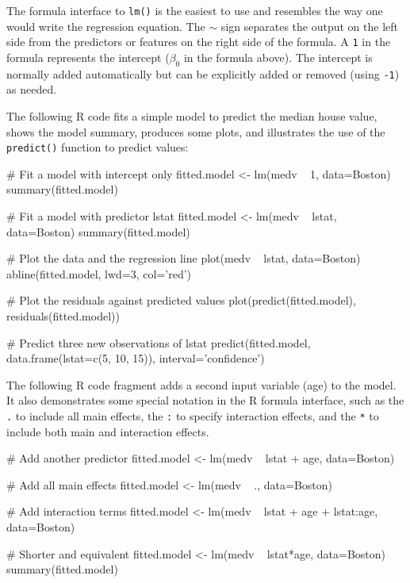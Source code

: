 The formula interface to \texttt{lm()} is the easiest to use and resembles the way one would write the regression equation. The $\sim$ sign separates the output on the left side from the predictors or features on the right side of the formula. A \texttt{1} in the formula represents the intercept ($\beta_0$ in the formula above). The intercept is normally added automatically but can be explicitly added or removed (using \texttt{-1}) as needed. 

The following R code fits a simple model to predict the median house value, shows the model summary, produces some plots, and illustrates the use of the \texttt{predict()} function to predict values:

\begin{samepage}
\begin{Rcode}
# Fit a model with intercept only
fitted.model <- lm(medv ~ 1, data=Boston)
summary(fitted.model)

# Fit a model with predictor lstat
fitted.model <- lm(medv ~ lstat, data=Boston)
summary(fitted.model)

# Plot the data and the regression line
plot(medv ~ lstat, data=Boston)
abline(fitted.model, lwd=3, col='red')

# Plot the residuals against predicted values
plot(predict(fitted.model), residuals(fitted.model))

# Predict three new observations of lstat
predict(fitted.model, data.frame(lstat=c(5, 10, 15)), 
   interval='confidence')
\end{Rcode}
\end{samepage}

The following R code fragment adds a second input variable (age) to the model. It also demonstrates some special notation in the R formula interface, such as the \texttt{.} to include all main effects, the \texttt{:} to specify interaction effects, and the \texttt{*} to include both main and interaction effects.

\begin{samepage}
\begin{Rcode}
# Add another predictor
fitted.model <- lm(medv ~ lstat + age, data=Boston)

# Add all main effects
fitted.model <- lm(medv ~ ., data=Boston)

# Add interaction terms
fitted.model <- lm(medv ~ lstat + age + lstat:age, data=Boston)
   
# Shorter and equivalent
fitted.model <- lm(medv ~ lstat*age, data=Boston)
summary(fitted.model)
\end{Rcode}
\end{samepage}

